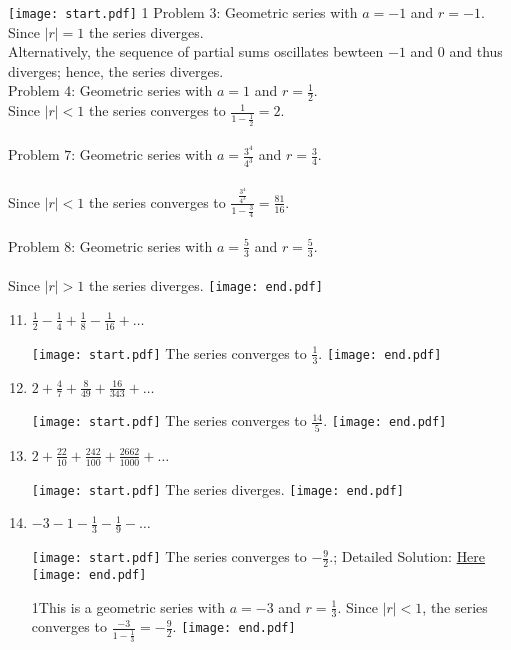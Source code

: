 \documentclass[12pt]{article}
\begin{document}
\begin{enumerate}
\texttt{[image: start.pdf]}
{{{1\linewidth}{
Problem $3$: Geometric series with $a=-1$ and $r=-1$.  \\ Since $|r|=1$ the series diverges.  \\ Alternatively, the sequence of partial sums oscillates bewteen $-1$ and $0$ and thus diverges; hence, the series diverges. 
\\ Problem $4$: Geometric series with $a=1$ and $r=\frac{1}{2}$.  \\ Since $|r|<1$ the series converges to $\frac{1}{1-\frac{1}{2}}=2$.
\\ \\ Problem $7$: Geometric series with $a=\frac{3^4}{4^3}$ and $r=\frac{3}{4}$. \\ \\ Since $|r|<1$ the series converges to $\frac{\frac{3^4}{4^3}}{1-\frac{3}{4}}=\frac{81}{16}$.
\\ \\ Problem $8$: Geometric series with $a=\frac{5}{3}$ and $r=\frac{5}{3}$.  \\ \\ Since $|r|>1$ the series diverges.
 }}}
\texttt{[image: end.pdf]}


\end{enumerate}


\begin{enumerate}
\setcounter{enumi}{10}

\item $\frac{1}{2}-\frac{1}{4}+\frac{1}{8}-\frac{1}{16}+\ldots$

\texttt{[image: start.pdf]}
{{The series converges to $\frac{1}{3}$. }}
\texttt{[image: end.pdf]}


\item $2+\frac{4}{7}+\frac{8}{49}+\frac{16}{343}+\ldots$

\texttt{[image: start.pdf]}
{{The series converges to $\frac{14}{5}$. }}
\texttt{[image: end.pdf]}


\item $2+\frac{22}{10}+\frac{242}{100}+\frac{2662}{1000}+\ldots$

\texttt{[image: start.pdf]}
{{The series diverges. }}
\texttt{[image: end.pdf]}


\item $-3-1-\frac{1}{3}-\frac{1}{9}-\ldots$

\texttt{[image: start.pdf]}
{{The series converges to $-\frac{9}{2}$.; Detailed Solution: \textcolor{blue}{\href{http://www.math.drexel.edu/classes/Calculus/resources/Math123HW/Solutions/123_07_Series_14.pdf}{Here}}}}
\texttt{[image: end.pdf]}
 

{{{1\linewidth}{This is a geometric series with $a=-3$ and $r=\frac{1}{3}$.  Since $|r|<1$, the series converges to $\frac{-3}{1-\frac{1}{3}}= -\frac{9}{2}$. }}}
\texttt{[image: end.pdf]}


\end{enumerate}
\end{document}
